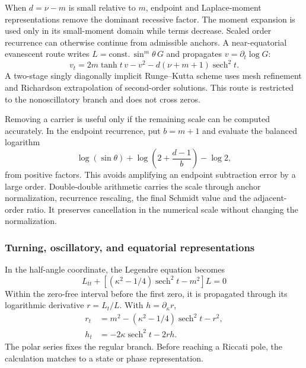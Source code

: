 ﻿\documentclass[11pt,a4paper]{article}
\newcommand{\sech}{\operatorname{sech}}
\begin{document}
When $d=\nu-m$ is small relative to $m$, endpoint and Laplace-moment representations remove the dominant recessive factor. The moment expansion is used only in its small-moment domain while terms decrease. Scaled order recurrence can otherwise continue from admissible anchors. A near-equatorial evanescent route writes $L=\mathrm{const.}\,\sin^m\theta\,G$ and propagates $v=\partial_t\log G$:
\begin{equation}
 v_t=2m\tanh t\,v-v^2-d(\nu+m+1)\sech^2t.
 \label{eq:legendre_near_order_residual_riccati}
\end{equation}
A two-stage singly diagonally implicit Runge--Kutta scheme uses mesh refinement and Richardson extrapolation of second-order solutions. This route is restricted to the nonoscillatory branch and does not cross zeros.

Removing a carrier is useful only if the remaining scale can be computed accurately. In the endpoint recurrence, put $b=m+1$ and evaluate the balanced logarithm
\begin{equation}
 \log(\sin\theta)+\log\left(2+\frac{d-1}{b}\right)-\log2,
 \label{eq:legendre_near_order_balanced_log}
\end{equation}
from positive factors. This avoids amplifying an endpoint subtraction error by a large order. Double-double arithmetic carries the scale through anchor normalization, recurrence rescaling, the final Schmidt value and the adjacent-order ratio. It preserves cancellation in the numerical scale without changing the normalization.

\subsubsection{Turning, oscillatory, and equatorial representations}

In the half-angle coordinate, the Legendre equation becomes
\begin{equation}
 L_{tt}+\left[(\kappa^2-1/4)\sech^2t-m^2\right]L=0
\end{equation}
Within the zero-free interval before the first zero, it is propagated through its logarithmic derivative $r=L_t/L$. With $h=\partial_\kappa r$,
\begin{align}
 r_t&=m^2-(\kappa^2-1/4)\sech^2t-r^2,\\
 h_t&=-2\kappa\sech^2t-2rh.
 \label{eq:legendre_riccati}
\end{align}
The polar series fixes the regular branch. Before reaching a Riccati pole, the calculation matches to a state or phase representation.
\end{document}

